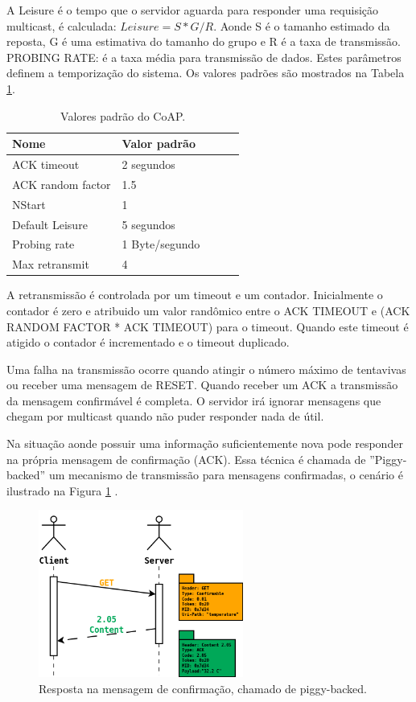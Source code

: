 A Leisure \'e o tempo que o servidor aguarda para responder uma requisi\c{c}\~ao multicast, \'e calculada: $Leisure = S * G / R$. Aonde S \'e o tamanho estimado da reposta, G \'e uma estimativa do tamanho do grupo e R \'e a taxa de transmiss\~ao. PROBING RATE: \'e a taxa m\'edia para transmiss\~ao de dados. Estes par\^ametros definem a temporiza\c{c}\~ao do sistema. Os valores padr\~oes s\~ao mostrados na Tabela \ref{coapDefault}.
\begin{table}[h]
\centering
\begin{tabular}{@{}lllll@{}}
\toprule
Nome & Valor padr\~ao & \\ \midrule
ACK timeout & 2 segundos & \\
ACK random factor & 1.5 & \\
NStart & 1 & \\
Default Leisure & 5 segundos & \\
Probing rate & 1 Byte/segundo & \\
Max retransmit & 4 &  \\ \midrule
\end{tabular}
\caption{Valores padr\~ao do CoAP.}
\label{coapDefault}
\end{table}

A retransmiss\~ao \'e controlada por um timeout e um contador. Inicialmente o contador \'e zero e atribuido um valor rand\^omico entre o ACK TIMEOUT e (ACK RANDOM FACTOR * ACK TIMEOUT) para o timeout. Quando este timeout \'e atigido o contador \'e incrementado e o timeout duplicado.

Uma falha na transmiss\~ao ocorre quando atingir o n\'umero m\'aximo de tentavivas ou receber uma mensagem de RESET. Quando receber um ACK a transmiss\~ao da mensagem confirm\'avel \'e completa. O servidor ir\'a ignorar mensagens que chegam por multicast quando n\~ao puder responder nada de \'util.

Na situa\c{c}\~ao aonde possuir uma informa\c{c}\~ao suficientemente nova pode responder na pr\'opria mensagem de confirma\c{c}\~ao (ACK). Essa t\'ecnica \'e chamada de ''Piggy-backed'' um mecanismo de transmiss\~ao para mensagens confirmadas, o cen\'ario \'e ilustrado na Figura \ref{piggyBacked} \cite{draft-ietf-core-coap-18}.
\begin{figure}[H]
   \centering
   \includegraphics[width=0.6\textwidth]{figuras/piggybacked.png}
   \caption{Resposta na mensagem de confirma\c{c}\~ao, chamado de piggy-backed.}
   \label{piggyBacked}
\end{figure}

